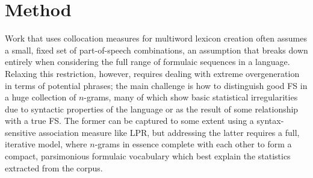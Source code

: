 \documentclass[11pt,letterpaper]{article}
\begin{document}
\section{Method}

Work that uses collocation measures for multiword lexicon creation often assumes a small, fixed set of part-of-speech combinations, an assumption that breaks down entirely when considering the full range of formulaic sequences in a language. Relaxing this restriction, however, requires dealing with extreme overgeneration in terms of potential phrases; the main challenge is how to distinguish good FS in a huge collection of $n$-grams, many of which show basic statistical irregularities due to syntactic properties of the language or as the result of some relationship with a true FS. The former can be captured to some extent using a syntax-sensitive association measure like LPR, but addressing the latter requires a full, iterative model, where $n$-grams in essence complete with each other to form a compact, parsimonious formulaic vocabulary which best explain the statistics extracted from the corpus.

\end{document}
